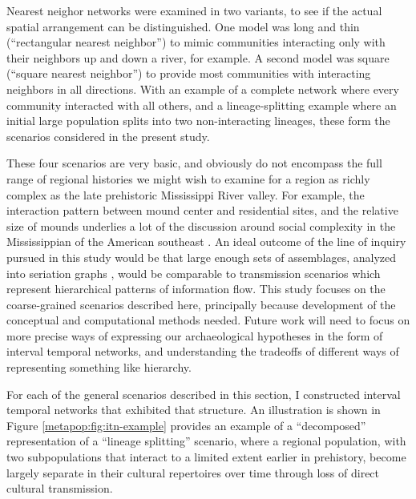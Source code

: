     Nearest neighor networks were examined in two variants, to see if the actual spatial arrangement can be distinguished.  One model was long and thin (``rectangular nearest neighbor'') to mimic communities interacting only with their neighbors up and down a river, for example.  A second model was square (``square nearest neighbor'') to provide most communities with interacting neighbors in all directions.  With an example of a complete network where every community interacted with all others, and a lineage-splitting example where an initial large population splits into two non-interacting lineages, these form the scenarios considered in the present study.
    
    These four scenarios are very basic, and obviously do not encompass the full range of regional histories we might wish to examine for a region as richly complex as the late prehistoric Mississippi River valley.  For example, the interaction pattern between mound center and residential sites, and the relative size of mounds underlies a lot of the discussion around social complexity in the Mississippian of the American southeast \citep{blitz2010new,cobb2003mississippian,Lipo2001a,Lipo2001}.  An ideal outcome of the line of inquiry pursued in this study would be that large enough sets of assemblages, analyzed into seriation graphs \citep{Lipo2015}, would be comparable to transmission scenarios which represent hierarchical patterns of information flow.   This study focuses on the coarse-grained scenarios described here, principally because  development of the conceptual and computational methods needed.  Future work will need to focus on more precise ways of expressing our archaeological hypotheses in the form of interval temporal networks, and understanding the tradeoffs of different ways of representing something like hierarchy.
    
    For each of the general scenarios described in this section, I constructed interval temporal networks that exhibited that structure.  An illustration is shown in Figure \ref{metapop:fig:itn-example} provides an example of a ``decomposed'' representation of a ``lineage splitting'' scenario, where a regional population, with two subpopulations that interact to a limited extent earlier in prehistory, become largely separate in their cultural repertoires over time through loss of direct cultural transmission.  
    
